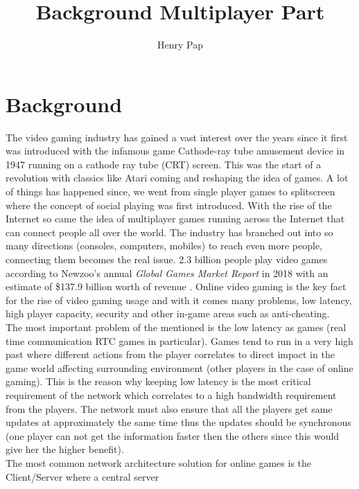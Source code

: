 \documentclass[12pt]{article}
\title{Background Multiplayer Part}
\author{Henry Pap}
\begin{document}
  \maketitle
  \clearpage 
  
  \section*{Background}
  The video gaming industry has gained a vast interest over the 
  years since it first was introduced with the infamous game 
  Cathode-ray tube amusement device in 1947 running on a cathode ray tube
  (CRT) screen. This was the start of a revolution with classics like Atari
  coming and reshaping the idea of games. A lot of things has happened 
  since, we went from single player games to splitscreen where the concept
  of social playing was first introduced. With the rise of the Internet 
  so came the idea of multiplayer games running across the Internet that 
  can connect people all over the world. The industry has branched out 
  into so many directions (consoles, computers, mobiles) to reach even 
  more people, connecting them becomes the real issue. 2.3 billion people
  play video games according to Newzoo's annual \textit{Global Games Market Report}
  in 2018 with an estimate of \$137.9 billion worth of revenue \cite{newzoo}. %
  Online video gaming is the key fact for the rise of video gaming usage and 
  with it comes many problems, low latency, high player capacity, security
  and other in-game areas such as anti-cheating. \\
  The most important problem of the mentioned is the low latency as games 
  (real time communication RTC games in particular). Games tend to run in a 
  very high past where different actions from the player correlates to direct 
  impact in the game world affecting surrounding environment (other players
  in the case of online gaming). This is the reason why keeping low latency
  is the most critical requirement of the network which correlates to a high 
  bandwidth requirement from the players. %
  The network must also ensure that all the players get same updates at 
  approximately the same time thus the updates should be synchronous (one 
  player can not get the information faster then the others since this would
  give her the higher benefit). \\

  \noindent The most common network architecture solution for online games 
  is the Client/Server where a central server 
  

  
  
  
\end{document}
